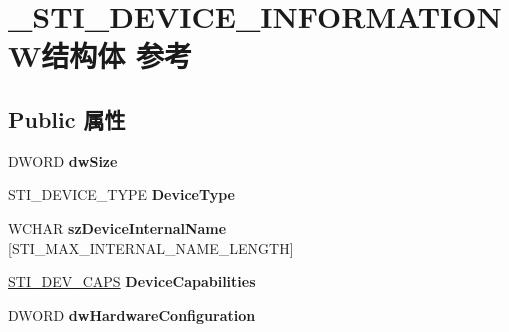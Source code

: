\hypertarget{struct___s_t_i___d_e_v_i_c_e___i_n_f_o_r_m_a_t_i_o_n_w}{}\section{\+\_\+\+S\+T\+I\+\_\+\+D\+E\+V\+I\+C\+E\+\_\+\+I\+N\+F\+O\+R\+M\+A\+T\+I\+O\+N\+W结构体 参考}
\label{struct___s_t_i___d_e_v_i_c_e___i_n_f_o_r_m_a_t_i_o_n_w}
\subsection*{Public 属性}
\begin{DoxyCompactItemize}
\item 
\mbox{\label{struct___s_t_i___d_e_v_i_c_e___i_n_f_o_r_m_a_t_i_o_n_w_a7327782ca2b39a440d45b5cdd82e74d9}} 
D\+W\+O\+RD {\bfseries dw\+Size}
\item 
\mbox{\label{struct___s_t_i___d_e_v_i_c_e___i_n_f_o_r_m_a_t_i_o_n_w_aded66a2d9d93cec4fa39e4aacd8ddce0}} 
S\+T\+I\+\_\+\+D\+E\+V\+I\+C\+E\+\_\+\+T\+Y\+PE {\bfseries Device\+Type}
\item 
\mbox{\label{struct___s_t_i___d_e_v_i_c_e___i_n_f_o_r_m_a_t_i_o_n_w_aa77ec2a9193739138d44d677e5340f16}} 
W\+C\+H\+AR {\bfseries sz\+Device\+Internal\+Name} \mbox{[}S\+T\+I\+\_\+\+M\+A\+X\+\_\+\+I\+N\+T\+E\+R\+N\+A\+L\+\_\+\+N\+A\+M\+E\+\_\+\+L\+E\+N\+G\+TH\mbox{]}
\item 
\mbox{\label{struct___s_t_i___d_e_v_i_c_e___i_n_f_o_r_m_a_t_i_o_n_w_ac90f3468c8ab52cb7f10533c18d5288a}} 
\hyperlink{struct___s_t_i___d_e_v___c_a_p_s}{S\+T\+I\+\_\+\+D\+E\+V\+\_\+\+C\+A\+PS} {\bfseries Device\+Capabilities}
\item 
\mbox{\label{struct___s_t_i___d_e_v_i_c_e___i_n_f_o_r_m_a_t_i_o_n_w_a349dbad06376cc35717d86441b0133df}} 
D\+W\+O\+RD {\bfseries dw\+Hardware\+Configuration}
\item 
\mbox{\label{struct___s_t_i___d_e_v_i_c_e___i_n_f_o_r_m_a_t_i_o_n_w_a5745406ab669d8e9bf3021decde5063a}} 

\end{DoxyCompactItemize}
